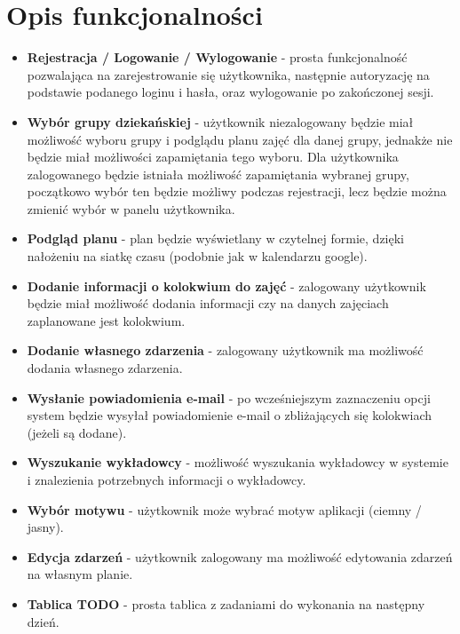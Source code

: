 \documentclass[a4paper,11pt]{uzreport}
\begin{document}
\clearpage
\section{Opis funkcjonalności}
    
    \begin{itemize}[leftmargin=0.50in]
    
        \item \textbf{Rejestracja / Logowanie / Wylogowanie} - prosta funkcjonalność pozwalająca na zarejestrowanie się użytkownika, następnie autoryzację na podstawie podanego loginu i hasła, oraz wylogowanie po zakończonej sesji.
        
        \item \textbf{Wybór grupy dziekańskiej} - użytkownik niezalogowany będzie miał możliwość wyboru grupy i podglądu planu zajęć dla danej grupy, jednakże nie będzie miał możliwości zapamiętania tego wyboru. Dla użytkownika zalogowanego będzie istniała możliwość zapamiętania wybranej grupy, początkowo wybór ten będzie możliwy podczas rejestracji, lecz będzie można zmienić wybór w panelu użytkownika.
        
        \item \textbf{Podgląd planu} - plan będzie wyświetlany w czytelnej formie, dzięki nałożeniu na siatkę czasu (podobnie jak w kalendarzu google).
        
        \item \textbf{Dodanie informacji o kolokwium do zajęć} - zalogowany użytkownik będzie miał możliwość dodania informacji czy na danych zajęciach zaplanowane jest kolokwium.
        
        \item \textbf{Dodanie własnego zdarzenia} - zalogowany użytkownik ma możliwość dodania własnego zdarzenia.
        
        \item \textbf{Wysłanie powiadomienia e-mail} - po wcześniejszym zaznaczeniu opcji system będzie wysyłał powiadomienie e-mail o zbliżających się kolokwiach (jeżeli są dodane).
        
        \item \textbf{Wyszukanie wykładowcy} - możliwość wyszukania wykładowcy w systemie i znalezienia potrzebnych informacji o wykładowcy.
        
        \item \textbf{Wybór motywu} - użytkownik może wybrać motyw aplikacji (ciemny / jasny).
        
        \item \textbf{Edycja zdarzeń} - użytkownik zalogowany ma możliwość edytowania zdarzeń na własnym planie.
        
        \item \textbf{Tablica TODO} - prosta tablica z zadaniami do wykonania na następny dzień.
        
    \end{itemize}
    
\end{document}
